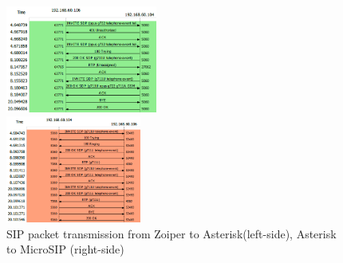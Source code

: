 \begin{figure}[htbp]
	\begin{minipage}{0.24\textwidth}
		\begin{flushleft}
			\includegraphics[height=100pt,width=\textwidth]{Images/experiment/a1.png}
		\end{flushleft}
	\end{minipage}
	\begin{minipage}{0.24\textwidth}
		\begin{flushright}
			\includegraphics[height=100pt,width=\textwidth]{Images/experiment/a2.png}
		\end{flushright}
	\end{minipage}
	\caption{SIP packet transmission from Zoiper to Asterisk(left-side), Asterisk to MicroSIP (right-side)}
	\label{fig:packet-trace}
\end{figure}